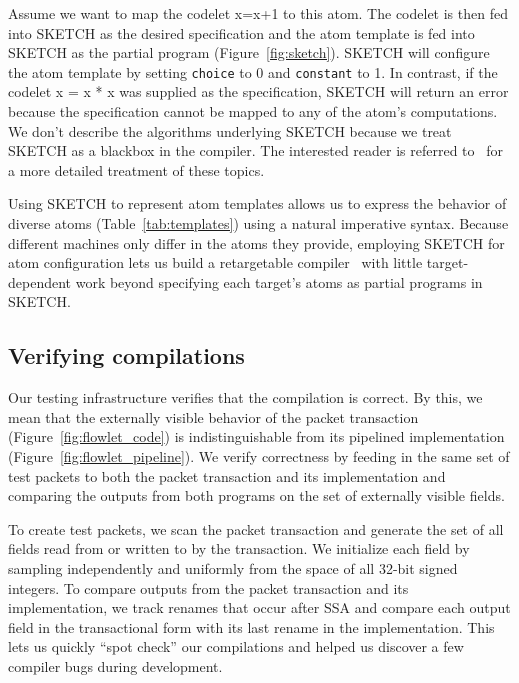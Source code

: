 Assume we want to map the codelet x=x+1 to this atom. The codelet is then fed
into SKETCH as the desired specification and the atom template is fed into
SKETCH as the partial program (Figure~\ref{fig:sketch}). SKETCH will configure
the atom template by setting \texttt{choice} to 0 and \texttt{constant} to 1.
In contrast, if the codelet x = x * x was supplied as the specification, SKETCH
will return an error because the specification cannot be mapped to any of the
atom's computations. We don't describe the algorithms underlying SKETCH because
we treat SKETCH as a blackbox in the \pktlanguage compiler. The interested
reader is referred to~\cite{bitstreaming, sketch_asplos} for a more detailed
treatment of these topics.

Using SKETCH to represent atom templates allows us to express the behavior of
diverse atoms (Table~\ref{tab:templates}) using a natural imperative syntax.
Because different \absmachine machines only differ in the atoms they provide,
employing SKETCH for atom configuration lets us build a retargetable
compiler~\cite{lcc} with little target-dependent work beyond specifying each
target's atoms as partial programs in SKETCH.

\subsection{Verifying compilations}
\label{ss:verification}

Our testing infrastructure verifies that the compilation is correct. By this,
we mean that the externally visible behavior of the packet transaction
(Figure~\ref{fig:flowlet_code}) is indistinguishable from its pipelined
implementation (Figure~\ref{fig:flowlet_pipeline}). We verify correctness by
feeding in the same set of test packets to both the packet transaction and its
implementation and comparing the outputs from both programs on the set of
externally visible fields.

To create test packets, we scan the packet transaction and generate the set of
all fields read from or written to by the transaction. We initialize each field
by sampling independently and uniformly from the space of all 32-bit signed
integers.  To compare outputs from the packet transaction and its
implementation, we track renames that occur after SSA and compare each output
field in the transactional form with its last rename in the implementation.
This lets us quickly ``spot check'' our compilations and helped us discover a
few compiler bugs during development.

